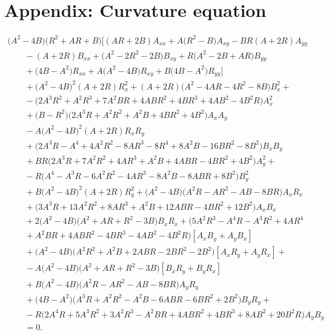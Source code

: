\section{Appendix: Curvature equation}\label{AppendixA}
\begin{gather*}
\bigl(A^2 - 4B\bigr)\bigl(R^2 +AR+ B\bigr)\bigl[(AR + 2B)A_{xx}+A\bigl(R^2-B\bigr)A_{xy}-BR(A + 2R)A_{yy}
\\
\qquad{}-(A + 2R)B_{xx}+ \bigl(A^2-2R^2- 2B\bigr)B_{xy}+R\bigl(A^2 -2B+AR\bigr)B_{yy}
\\
\qquad{}+\bigl(4B-A^2\bigr)R_{xx}+A\bigl(A^2 - 4B\bigr)R_{xy}+B\bigl(4B-A^2\bigr)R_{yy}\bigr]
\\
\qquad{}+\bigl(A^2 - 4B\bigr)^2(A + 2R)R_x^2+(A + 2R)\bigl(A^2 - 4AR - 4R^2 - 8B\bigr)B_x^2+
\\
\qquad{} - \bigl(2A^3R^2 + A^2R^3 + 7A^2BR + 4ABR^2 + 4BR^3 + 4AB^2 - 4B^2R\bigr)A_x^2
\\
\qquad{}+\bigl(B-R^2\bigr)\bigl(2A^3R + A^2R^2 + A^2B + 4BR^2 + 4B^2\bigr)A_xA_y \\
\qquad{}- A\bigl(A^2 - 4B\bigr)^2(A + 2R)R_xR_y
\\
\qquad{}+\bigl( 2A^3R-A^4 + 4A^2R^2 - 8AR^3 - 8R^4 + 8A^2B - 16BR^2 - 8B^2\bigr)B_xB_y
 \\
\qquad{}+BR\bigl(2A^3R + 7A^2R^2 + 4AR^3 + A^2B + 4ABR - 4BR^2 + 4B^2\bigr)A_y^2+
 \\
\qquad{}-R\bigl(A^4 - A^3R - 6A^2R^2 - 4AR^3 - 8A^2B - 8ABR + 8B^2\bigr)B_y^2
 \\
\qquad{}+B\bigl(A^2 - 4B\bigr)^2(A + 2R)R_y^2 +\bigl(A^2 - 4B\bigr)\bigl(A^2R - AR^2 - AB - 8BR\bigr)A_xR_x
 \\
\qquad{}+\bigl(3A^3R + 13A^2R^2 + 8AR^3 + A^2B + 12ABR - 4BR^2 + 12B^2\bigr)A_xB_x
 \\
\qquad{}+2\bigl(A^2 - 4B\bigr)\bigl(A^2 + AR + R^2 - 3B\bigr)B_xR_x
+\bigl( 5A^2R^3-A^4R - A^3R^2 + 4AR^4 \\
\qquad{} + A^2BR+ 4ABR^2 - 4BR^3 - 4AB^2 - 4B^2R\bigr)[A_xB_y+A_yB_x]
 \\
\qquad{}+\bigl(A^2 - 4B\bigr)\bigl(A^2R^2 + A^2B + 2ABR - 2BR^2 - 2B^2\bigr)[A_xR_y+A_yR_x] +
 \\
\qquad{}-A\bigl(A^2 - 4B\bigr)\bigl(A^2 + AR + R^2 - 3B\bigr)[B_xR_y+B_yR_x]
 \\
\qquad{}+B\bigl(A^2 - 4B\bigr)\bigl(A^2R - AR^2 - AB - 8BR\bigr)A_yR_y
 \\
\qquad{}+\bigl(4B-A^2 \bigr)\bigl(A^3R + A^2R^2 - A^2B - 6ABR - 6BR^2 + 2B^2\bigr)B_yR_y+
 \\
\qquad{}-R\bigl(2A^4R + 5A^3R^2 + 3A^2R^3 - A^2BR + 4ABR^2 + 4BR^3 + 8AB^2 + 20B^2R\bigr)A_yB_y \\
\qquad{}=0.
\end{gather*}
